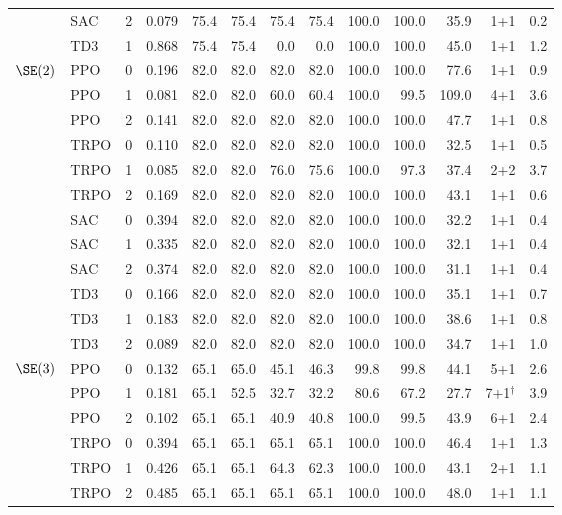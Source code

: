 \begin{tabular}{@{}lllrrrrrrrrrr@{}}
 & SAC & 2 & 0.079 & 75.4 & 75.4 & 75.4 & 75.4 & 100.0 & 100.0 & 35.9 & 1+1 & 0.2 \\
 & TD3 & 1 & 0.868 & 75.4 & 75.4 & 0.0 & 0.0 & 100.0 & 100.0 & 45.0 & 1+1 & 1.2 \\
\midrule
$\SE(2)$ & PPO & 0 & 0.196 & 82.0 & 82.0 & 82.0 & 82.0 & 100.0 & 100.0 & 77.6 & 1+1 & 0.9 \\
 & PPO & 1 & 0.081 & 82.0 & 82.0 & 60.0 & 60.4 & 100.0 & 99.5 & 109.0 & 4+1 & 3.6 \\
 & PPO & 2 & 0.141 & 82.0 & 82.0 & 82.0 & 82.0 & 100.0 & 100.0 & 47.7 & 1+1 & 0.8 \\
 & TRPO & 0 & 0.110 & 82.0 & 82.0 & 82.0 & 82.0 & 100.0 & 100.0 & 32.5 & 1+1 & 0.5 \\
 & TRPO & 1 & 0.085 & 82.0 & 82.0 & 76.0 & 75.6 & 100.0 & 97.3 & 37.4 & 2+2 & 3.7 \\
 & TRPO & 2 & 0.169 & 82.0 & 82.0 & 82.0 & 82.0 & 100.0 & 100.0 & 43.1 & 1+1 & 0.6 \\
 & SAC & 0 & 0.394 & 82.0 & 82.0 & 82.0 & 82.0 & 100.0 & 100.0 & 32.2 & 1+1 & 0.4 \\
 & SAC & 1 & 0.335 & 82.0 & 82.0 & 82.0 & 82.0 & 100.0 & 100.0 & 32.1 & 1+1 & 0.4 \\
 & SAC & 2 & 0.374 & 82.0 & 82.0 & 82.0 & 82.0 & 100.0 & 100.0 & 31.1 & 1+1 & 0.4 \\
 & TD3 & 0 & 0.166 & 82.0 & 82.0 & 82.0 & 82.0 & 100.0 & 100.0 & 35.1 & 1+1 & 0.7 \\
 & TD3 & 1 & 0.183 & 82.0 & 82.0 & 82.0 & 82.0 & 100.0 & 100.0 & 38.6 & 1+1 & 0.8 \\
 & TD3 & 2 & 0.089 & 82.0 & 82.0 & 82.0 & 82.0 & 100.0 & 100.0 & 34.7 & 1+1 & 1.0 \\
\midrule
$\SE(3)$ & PPO & 0 & 0.132 & 65.1 & 65.0 & 45.1 & 46.3 & 99.8 & 99.8 & 44.1 & 5+1 & 2.6 \\
 & PPO & 1 & 0.181 & 65.1 & 52.5 & 32.7 & 32.2 & 80.6 & 67.2 & 27.7 & 7+1$^{\dagger}$ & 3.9 \\
 & PPO & 2 & 0.102 & 65.1 & 65.1 & 40.9 & 40.8 & 100.0 & 99.5 & 43.9 & 6+1 & 2.4 \\
 & TRPO & 0 & 0.394 & 65.1 & 65.1 & 65.1 & 65.1 & 100.0 & 100.0 & 46.4 & 1+1 & 1.3 \\
 & TRPO & 1 & 0.426 & 65.1 & 65.1 & 64.3 & 62.3 & 100.0 & 100.0 & 43.1 & 2+1 & 1.1 \\
 & TRPO & 2 & 0.485 & 65.1 & 65.1 & 65.1 & 65.1 & 100.0 & 100.0 & 48.0 & 1+1 & 1.1 \\
\bottomrule
\end{tabular}
